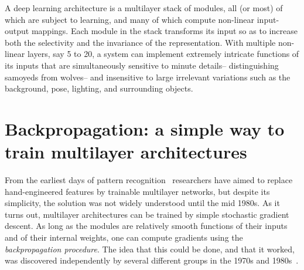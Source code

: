 \documentclass[10pts]{article}
\newcommand{\citep}[1]{\cite{#1}}
\begin{document}

A deep learning architecture is a multilayer stack of modules, all (or
most) of which are subject to learning, and many of which compute
non-linear input-output mappings.  Each module in the stack transforms
its input so as to increase both the selectivity and the invariance of
the representation. With multiple non-linear layers, say 5 to 20, a system
can implement extremely intricate functions of its inputs that are
simultaneously sensitive to minute details-- distinguishing samoyeds
from wolves-- and insensitive to large irrelevant variations such as the
background, pose, lighting, and surrounding objects.

\section{Backpropagation: a simple way to train multilayer architectures} 

From the earliest days of pattern
recognition~\citep{selfridge,Rosenblatt57} researchers have aimed to
replace hand-engineered features by trainable multilayer networks,
but despite its simplicity, the solution was not widely
understood until
the mid 1980s.  
As it turns out, multilayer architectures can be
trained by simple stochastic gradient descent. As long as the modules are
relatively smooth functions of their inputs and of their internal
weights, one can compute gradients using the {\em backpropagation
  procedure}.
The idea that this could be done, and that it worked, was discovered independently by
several different groups in the 1970s and
1980s~\citep{Werbos74,Parker85,LeCun85,RHW}. 
\end{document}
